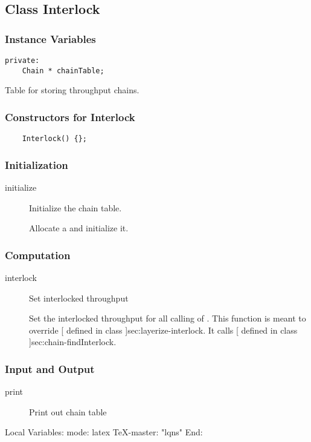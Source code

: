 \htmlrule
\subsection{Class Interlock}
\label{sec:interlock}

\subsubsection{Instance Variables}
\label{sec: -ivars}
\begin{verbatim}
private:
    Chain * chainTable;
\end{verbatim}

\begin{description}
\label{sec:interlock-interlock}
\item[chainTable] \texonly{---} Table for storing throughput chains.
\end{description}

\subsubsection{Constructors for Interlock}

\begin{verbatim}
    Interlock() {};
\end{verbatim}

\subsubsection{Initialization}
\begin{description}
\item[initialize] \texonly{---} Initialize the chain table.\\

Allocate a  and initialize it.

\end{description}

\subsubsection{Computation}

\begin{description}
\item[interlock] \texonly{---} Set interlocked throughput \\

Set the interlocked throughput for all calling  of
.  This function is meant to override
[ defined in class
]{sec:layerize-interlock}.  It calls
[ defined in class ]{sec:chain-findInterlock}.

\end{description}

\subsubsection{Input and Output}
\begin{description}
\item[print] \texonly{---} Print out chain table\\

\end{description}
\C Local Variables: 
\C mode: latex
\C TeX-master: "lqns"
\C End: 
